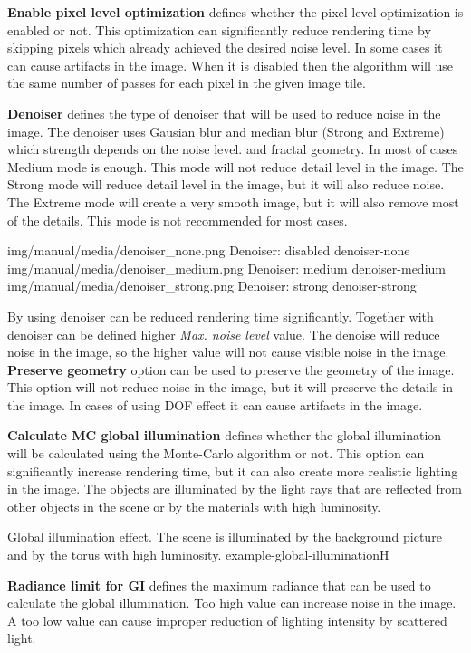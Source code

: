\textbf{Enable pixel level optimization} defines whether the pixel level optimization is enabled or not. This optimization can significantly reduce rendering time by skipping pixels which already achieved the desired noise level. In some cases it can cause artifacts in the image. When it is disabled then the algorithm will use the same number of passes for each pixel in the given image tile.

\textbf{Denoiser} defines the type of denoiser that will be used to reduce noise in the image. The denoiser uses Gausian blur and median blur (Strong and Extreme) which strength depends on the noise level. and fractal geometry. In most of cases Medium mode is enough. This mode will not reduce detail level in the image. The Strong mode will reduce detail level in the image, but it will also reduce noise. The Extreme mode will create a very smooth image, but it will also remove most of the details. This mode is not recommended for most cases.

\threeImagesWithTwoCaptionsFullWidth
{img/manual/media/denoiser_none.png}
{Denoiser: disabled}
{denoiser-none}
{img/manual/media/denoiser_medium.png}
{Denoiser: medium}
{denoiser-medium}
{img/manual/media/denoiser_strong.png}
{Denoiser: strong}
{denoiser-strong}


By using denoiser can be reduced rendering time significantly. Together with denoiser can be defined higher \emph{Max. noise level} value. The denoise will reduce noise in the image, so the higher value will not cause visible noise in the image.
\textbf{Preserve geometry} option can be used to preserve the geometry of the image. This option will not reduce noise in the image, but it will preserve the details in the image. In cases of using DOF effect it can cause artifacts in the image.

\textbf{Calculate MC global illumination} defines whether the global illumination will be calculated using the Monte-Carlo algorithm or not. This option can significantly increase rendering time, but it can also create more realistic lighting in the image. The objects are illuminated by the light rays that are reflected from other objects in the scene or by the materials with high luminosity.

{Global illumination effect. The scene is illuminated by the background picture and by the torus with high luminosity.}
{example-global-illumination}{H}

\textbf{Radiance limit for GI} defines the maximum radiance that can be used to calculate the global illumination. Too high value can increase noise in the image. A too low value can cause improper reduction of lighting intensity by scattered light.


